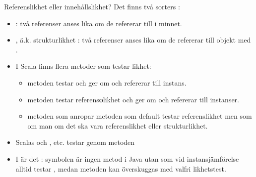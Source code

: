 


\begin{Slide}{Referenslikhet eller innehållslikhet?}\SlideFontSmall
Det finns två  sorters :
\begin{itemize}
\item {} : två referenser anses lika om de refererar till  i minnet.
\item {}, ä.k. strukturlikhet : två referenser anses lika om de refererar till objekt med .

\pause

\item I Scala finns flera metoder som testar likhet:
\begin{itemize}\SlideFontSmall
\item metoden  testar  och  ger  om  och  refererar till  instans.

\item metoden  testar referens\textbf{o}likhet och  ger  om  och  refererar till  instanser.

\item metoden \code{==} som anropar metoden  som default testar referenslikhet men som  om man  om det ska vara referenslikhet eller strukturlikhet.
\end{itemize}

\pause

\item Scalas  och  ,  etc. testar  genom metoden \code{==}
\pause
\item I  är det : symbolen \code{==} är ingen metod i Java utan  som vid instansjämförelse alltid testar , medan metoden  kan överskuggas med valfri likhetstest.
\end{itemize}
\end{Slide}


